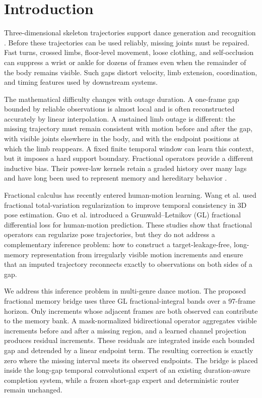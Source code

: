 \documentclass[fractalfract,article,submit,moreauthors,pdftex]{Definitions/mdpi}
\begin{document}
\section{Introduction}

Three-dimensional skeleton trajectories support dance generation and recognition \cite{li2021aist,hu2021dance}. Before these trajectories can be used reliably, missing joints must be repaired. Fast turns, crossed limbs, floor-level movement, loose clothing, and self-occlusion can suppress a wrist or ankle for dozens of frames even when the remainder of the body remains visible. Such gaps distort velocity, limb extension, coordination, and timing features used by downstream systems.

The mathematical difficulty changes with outage duration. A one-frame gap bounded by reliable observations is almost local and is often reconstructed accurately by linear interpolation. A sustained limb outage is different: the missing trajectory must remain consistent with motion before and after the gap, with visible joints elsewhere in the body, and with the endpoint positions at which the limb reappears. A fixed finite temporal window can learn this context, but it imposes a hard support boundary. Fractional operators provide a different inductive bias. Their power-law kernels retain a graded history over many lags and have long been used to represent memory and hereditary behavior \cite{podlubny1999fractional,diethelm2010analysis}.

Fractional calculus has recently entered human-motion learning. Wang et al. \cite{wang2025pose3dm} used fractional total-variation regularization to improve temporal consistency in 3D pose estimation. Guo et al. \cite{guo2026fotsr} introduced a Grunwald--Letnikov (GL) fractional differential loss for human-motion prediction. These studies show that fractional operators can regularize pose trajectories, but they do not address a complementary inference problem: how to construct a target-leakage-free, long-memory representation from irregularly visible motion increments and ensure that an imputed trajectory reconnects exactly to observations on both sides of a gap.

We address this inference problem in multi-genre dance motion. The proposed fractional memory bridge uses three GL fractional-integral bands over a 97-frame horizon. Only increments whose adjacent frames are both observed can contribute to the memory bank. A mask-normalized bidirectional operator aggregates visible increments before and after a missing region, and a learned channel projection produces residual increments. These residuals are integrated inside each bounded gap and detrended by a linear endpoint term. The resulting correction is exactly zero where the missing interval meets its observed endpoints. The bridge is placed inside the long-gap temporal convolutional expert of an existing duration-aware completion system, while a frozen short-gap expert and deterministic router remain unchanged.
\end{document}
